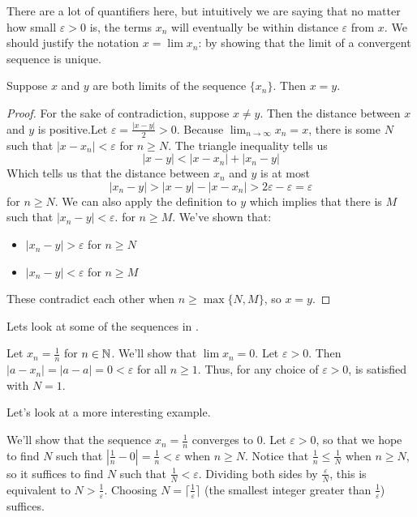 \documentclass[../notes.tex]{subfiles}
\begin{document}
There are a lot of quantifiers here, but intuitively we are saying that no matter how small $\varepsilon>0$ is, the terms $x_n$ will eventually be within distance $\varepsilon$ from $x$. We should justify the notation $x=\lim x_n$: by showing that the limit of a convergent sequence is unique.

\begin{proposition}
    Suppose $x$ and $y$ are both limits of the sequence $\{x_n\}$. Then $x=y$. 
\end{proposition}
\begin{proof}
    For the sake of contradiction, suppose $x\neq y$. Then the distance between $x$ and $y$ is positive.Let $\varepsilon=\frac{|x-y|}{2}>0$. Because $\lim_{n\to \infty}x_n = x$, there is some $N$ such that $|x-x_n| < \varepsilon$ for $n\geq N$. 
    The triangle inequality tells us
    \[ |x-y| < |x-x_n|+|x_n-y| \]
    Which tells us that the distance between $x_n$ and $y$ is at most
    \[ |x_n - y| > |x-y|-|x-x_n| > 2\varepsilon - \varepsilon = \varepsilon\]
    for $n\geq N$. We can also apply the definition to $y$ which implies that there is $M$ such that $|x_n - y| < \varepsilon$. for $n\geq M$. We've shown that:
    \begin{itemize}
        \item $|x_n - y| > \varepsilon$ for $n\geq N$
        \item $|x_n -y| < \varepsilon$ for $n\geq M$
    \end{itemize}
    These contradict each other when $n\geq \max\{N, M\}$, so $x=y$.  
\end{proof}

Lets look at some of the sequences in .

\begin{example}
    Let $x_n=\frac{1}{n}$ for $n\in\mathbb N$. We'll show that $\lim x_n = 0$. Let $\varepsilon>0$. Then $|a-x_n|=|a-a|=0 <\varepsilon$ for all $n\geq 1$. Thus, for any choice of $\varepsilon>0$,  is satisfied with $N=1$. 
\end{example}

Let's look at a more interesting example. 

\begin{example}
    We'll show that the sequence $x_n=\frac{1}{n}$ converges to $0$. Let $\varepsilon>0$, so that we hope to find $N$ such that $|\frac{1}{n}-0|=\frac{1}{n}<\varepsilon$ when $n\geq N$. Notice that $\frac{1}{n}\leq \frac{1}{N}$ when $n\geq N$, so it suffices to find $N$ such that $\frac{1}{N}<\varepsilon$. Dividing both sides by $\frac{\varepsilon}{N}$, this is equivalent to $N > \frac{1}{\varepsilon}$. Choosing $N=\lceil \frac{1}{\varepsilon}\rceil$ (the smallest integer greater than $\frac{1}{\varepsilon}$) suffices.
\end{example}
\end{document}
